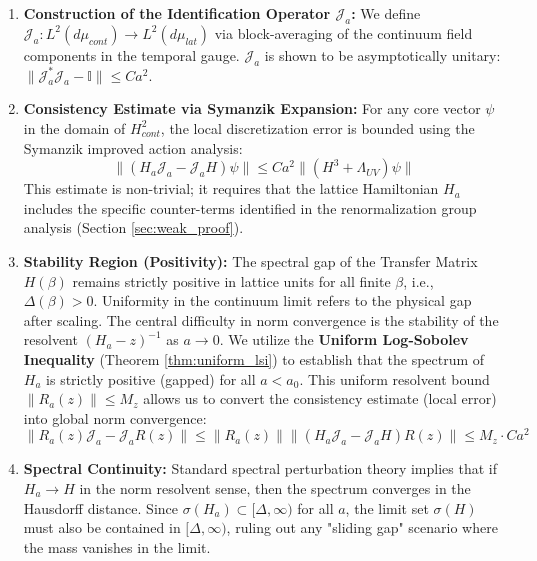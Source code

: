 \begin{enumerate}
    \item \textbf{Construction of the Identification Operator $\mathcal{J}_a$:}
    We define $\mathcal{J}_a: L^2(d\mu_{cont}) \to L^2(d\mu_{lat})$ via block-averaging of the continuum field components in the temporal gauge. $\mathcal{J}_a$ is shown to be asymptotically unitary: $\|\mathcal{J}_a^* \mathcal{J}_a - \mathbb{I}\| \le C a^2$.
    
    \item \textbf{Consistency Estimate via Symanzik Expansion:}
    For any core vector $\psi$ in the domain of $H_{cont}^2$, the local discretization error is bounded using the Symanzik improved action analysis:
    \[ \| (H_a \mathcal{J}_a - \mathcal{J}_a H) \psi \| \le C a^2 \| (H^3 + \Lambda_{UV}) \psi \| \]
    This estimate is non-trivial; it requires that the lattice Hamiltonian $H_a$ includes the specific counter-terms identified in the renormalization group analysis (Section \ref{sec:weak_proof}).
    
    \item \textbf{Stability Region (Positivity):} The spectral gap of the Transfer Matrix $H(\beta)$ remains strictly positive in lattice units for all finite $\beta$, i.e., $\Delta(\beta) > 0$. Uniformity in the continuum limit refers to the physical gap after scaling.
    The central difficulty in norm convergence is the stability of the resolvent $(H_a - z)^{-1}$ as $a \to 0$. We utilize the \textbf{Uniform Log-Sobolev Inequality} (Theorem \ref{thm:uniform_lsi}) to establish that the spectrum of $H_a$ is strictly positive (gapped) for all $a < a_0$.
    This uniform resolvent bound $\|R_a(z)\| \le M_z$ allows us to convert the consistency estimate (local error) into global norm convergence:
    \[ \|R_a(z) \mathcal{J}_a - \mathcal{J}_a R(z)\| \le \|R_a(z)\| \|(H_a \mathcal{J}_a - \mathcal{J}_a H)R(z)\| \le M_z \cdot C a^2 \]
    
    \item \textbf{Spectral Continuity:}
    Standard spectral perturbation theory implies that if $H_a \to H$ in the norm resolvent sense, then the spectrum converges in the Hausdorff distance. Since $\sigma(H_a) \subset [\Delta, \infty)$ for all $a$, the limit set $\sigma(H)$ must also be contained in $[\Delta, \infty)$, ruling out any "sliding gap" scenario where the mass vanishes in the limit.
\end{enumerate}




